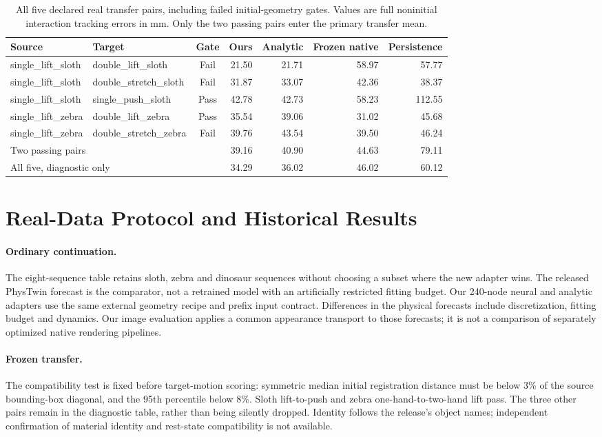 \documentclass[10pt,twocolumn,letterpaper]{article}
\begin{document}
\begin{table}[!t]
\centering\small\setlength{\tabcolsep}{3pt}\setlength{\tabcolsep}{4pt}
\caption{All five declared real transfer pairs, including failed initial-geometry gates. Values are full noninitial interaction tracking errors in mm. Only the two passing pairs enter the primary transfer mean.}
\begin{tabular}{llcrrrr}\toprule
Source & Target & Gate & Ours & Analytic & Frozen native & Persistence\\\midrule
single\_lift\_sloth & double\_lift\_sloth & Fail & 21.50 & 21.71 & 58.97 & 57.77\\
single\_lift\_sloth & double\_stretch\_sloth & Fail & 31.87 & 33.07 & 42.36 & 38.37\\
single\_lift\_sloth & single\_push\_sloth & Pass & 42.78 & 42.73 & 58.23 & 112.55\\
single\_lift\_zebra & double\_lift\_zebra & Pass & 35.54 & 39.06 & 31.02 & 45.68\\
single\_lift\_zebra & double\_stretch\_zebra & Fail & 39.76 & 43.54 & 39.50 & 46.24\\
\midrule\multicolumn{3}{l}{Two passing pairs} &39.16&40.90&44.63&79.11\\
\multicolumn{3}{l}{All five, diagnostic only} &34.29&36.02&46.02&60.12\\\bottomrule
\end{tabular}
\end{table}
\section{Real-Data Protocol and Historical Results}
\paragraph{Ordinary continuation.}
The eight-sequence table retains sloth, zebra and dinosaur sequences without choosing a subset where the new adapter wins. The released PhysTwin forecast is the comparator, not a retrained model with an artificially restricted fitting budget. Our 240-node neural and analytic adapters use the same external geometry recipe and prefix input contract. Differences in the physical forecasts include discretization, fitting budget and dynamics. Our image evaluation applies a common appearance transport to those forecasts; it is not a comparison of separately optimized native rendering pipelines.

\paragraph{Frozen transfer.}
The compatibility test is fixed before target-motion scoring: symmetric median initial registration distance must be below 3\% of the source bounding-box diagonal, and the 95th percentile below 8\%. Sloth lift-to-push and zebra one-hand-to-two-hand lift pass. The three other pairs remain in the diagnostic table, rather than being silently dropped. Identity follows the release's object names; independent confirmation of material identity and rest-state compatibility is not available.
\end{document}
